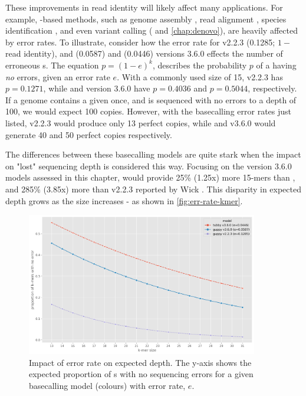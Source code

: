These improvements in read identity will likely affect many applications. For example, \kmer{}-based methods, such as genome assembly \cite{koren2017}, read alignment \cite{li2018}, species identification \cite{Breitwieser2018}, and even variant calling (\cite{iqbal2012} and \autoref{chap:denovo}), are heavily affected by error rates. To illustrate, consider how the error rate for \guppy{} v2.2.3 (0.1285; $1-$ read identity), and \guppy{} (0.0587) and \tubby{} (0.0446) versions 3.6.0 effects the number of erroneous \kmer{}s. The equation $p=(1-e)^k$, describes the probability $p$ of a \kmer{} having \emph{no} errors, given an error rate $e$. With a commonly used \ont{} \kmer{} size of 15, \guppy{} v2.2.3 has $p=0.1271$, while \guppy{} and \tubby{} version 3.6.0 have $p=0.4036$ and $p=0.5044$, respectively. If a genome contains a given \kmer{} once, and is sequenced with no errors to a depth of 100, we would expect 100 copies. However, with the \ont{} basecalling error rates just listed, \guppy{} v2.2.3 would produce only 13 perfect copies, while \guppy{} and \tubby{} v3.6.0 would generate 40 and 50 perfect copies respectively. 

The differences between these basecalling models are quite stark when the impact on "lost" sequencing depth is considered this way. Focusing on the version 3.6.0 models assessed in this chapter, \tubby{} would provide 25\% (1.25x)  more 15-mers than \guppy{}, and 285\% (3.85x) more than \guppy{} v2.2.3 reported by Wick \etal{}. This disparity in expected \kmer{} depth grows as the \kmer{} size increases - as shown in \autoref{fig:err-rate-kmer}.

\begin{figure}
\includegraphics[width=0.9\textwidth]{Chapter4/Figs/error_rate_k.png}
\centering
\caption{Impact of error rate on expected \kmer{} depth. The y-axis shows the expected proportion of \kmer{}s with no sequencing errors for a given basecalling model (colours) with error rate, $e$.}
\label{fig:err-rate-kmer}
\end{figure}


